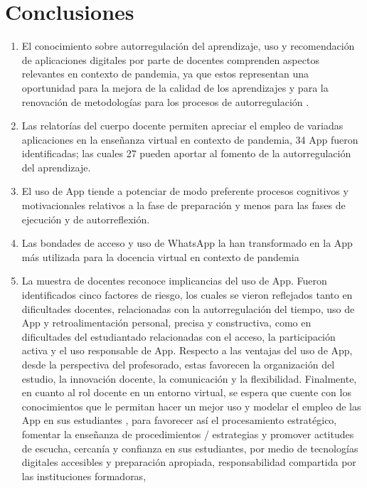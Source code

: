 \documentclass[spanish]{textolivre}
\begin{document}
\section{Conclusiones}
\begin{enumerate}
    \item El conocimiento sobre autorregulación del aprendizaje, uso y recomendación de aplicaciones digitales por parte de docentes comprenden aspectos relevantes en contexto de pandemia, ya que estos representan una oportunidad para la mejora de la calidad de los aprendizajes y para la renovación de metodologías para los procesos de autorregulación \cite[p. 69]{zimmerman2002}. 
    \item Las  relatorías del cuerpo docente permiten apreciar el empleo de  variadas aplicaciones en  la enseñanza virtual en contexto de pandemia, 34 App fueron identificadas; las cuales 27  pueden  aportar al fomento de la autorregulación del aprendizaje. 
    \item El uso de App tiende a potenciar de modo preferente procesos cognitivos y motivacionales relativos a la fase de preparación y menos para las fases de ejecución y de autorreflexión.
    \item Las bondades de  acceso y  uso de WhatsApp la han transformado en la App más utilizada para la docencia virtual en contexto de pandemia 
    \item La muestra de docentes reconoce implicancias del uso de App. Fueron identificados cinco factores de riesgo, los cuales se vieron reflejados tanto en dificultades docentes, relacionadas con la autorregulación del tiempo, uso de App y retroalimentación personal, precisa y constructiva, como en dificultades del estudiantado relacionadas con el acceso, la participación activa y el uso responsable de App. Respecto a las ventajas del uso de App, desde la perspectiva del profesorado, estas  favorecen la organización del estudio, la innovación docente, la comunicación y la flexibilidad. Finalmente, en cuanto al rol docente en un entorno virtual, se espera que cuente con los conocimientos que le permitan hacer un mejor uso y modelar el empleo de las App en sus estudiantes , para favorecer  así el procesamiento estratégico, fomentar la enseñanza de procedimientos / estrategias y promover  actitudes de escucha, cercanía y confianza en sus estudiantes, por medio de  tecnologías digitales accesibles y preparación apropiada, responsabilidad compartida por las instituciones formadoras,
\end{enumerate}
\end{document}
